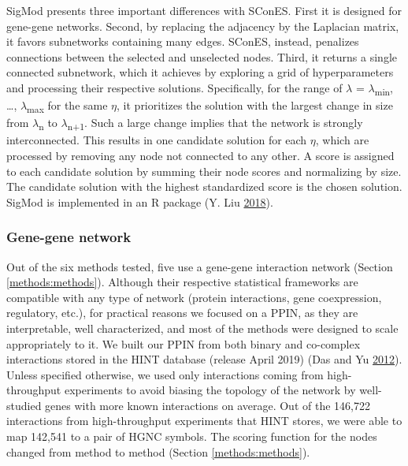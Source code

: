 \documentclass[
  11pt,
]{env/yjiao}
\begin{document}
\begin{description}
SigMod presents three important differences with SConES. First it is
designed for gene-gene networks. Second, by replacing the adjacency
by the Laplacian matrix, it favors subnetworks containing many
edges. SConES, instead, penalizes connections between the
selected and unselected nodes. Third, it returns a single connected
subnetwork, which it achieves by exploring a grid of hyperparameters
and processing their respective solutions. Specifically, for the
range of \(\lambda\) = \(\lambda\)\textsubscript{min}, \ldots, \(\lambda\)\textsubscript{max} for the
same \(\eta\), it prioritizes the solution with the largest change in
size from \(\lambda\)\textsubscript{n} to \(\lambda\)\textsubscript{n+1}. Such a large change
implies that the network is strongly interconnected. This results in
one candidate solution for each \(\eta\), which are processed by
removing any node not connected to any other. A score is assigned to
each candidate solution by summing their node scores and normalizing
by size. The candidate solution with the highest standardized score
is the chosen solution. SigMod is implemented in an R package
(Y. Liu \protect\hyperlink{ref-sigmod}{2018}).
\end{description}

\hypertarget{methods:gene-network}{%
\subsubsection{Gene-gene network}\label{methods:gene-network}}

Out of the six methods tested, five use a gene-gene interaction network
(Section \ref{methods:methods}). Although their respective statistical
frameworks are compatible with any type of network (protein
interactions, gene coexpression, regulatory, etc.), for practical
reasons we focused on a PPIN, as they are interpretable, well
characterized, and most of the methods were designed to scale
appropriately to it. We built our PPIN from both binary and co-complex
interactions stored in the HINT database (release April 2019)
(Das and Yu \protect\hyperlink{ref-das_hint_2012}{2012}). Unless specified otherwise, we used only interactions
coming from high-throughput experiments to avoid biasing the topology of
the network by well-studied genes with more known interactions on
average. Out of the 146,722 interactions from high-throughput
experiments that HINT stores, we were able to map 142,541 to a pair of
HGNC symbols. The scoring function for the nodes changed from method to
method (Section \ref{methods:methods}).
\end{document}

